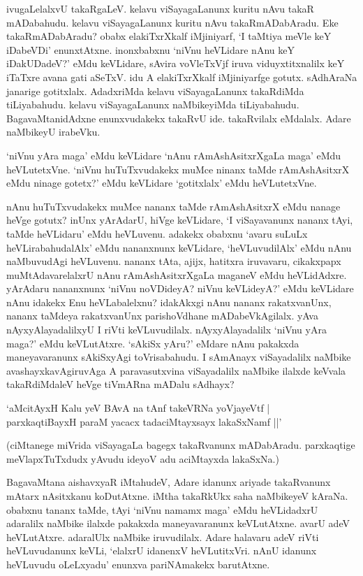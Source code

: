 ivugaLelalxvU takaRgaLeV. kelavu viSayagaLanunx kuritu nAvu takaR mADabahudu. kelavu viSayagaLanunx kuritu nAvu takaRmADabAradu. Eke takaRmADabAradu? obabx elakiTxrXkalf iMjiniyarf, `I taMtiya meVle keY iDabeVDi' enunxtAtxne. inonxbabxnu `niVnu heVLidare nAnu keY iDakUDadeV?' eMdu keVLidare, sAvira voVleTxVjf iruva viduyxtitxnalilx keY iTaTxre avana gati aSeTxV. idu A elakiTxrXkalf iMjiniyarfge gotutx. sAdhAraNa janarige gotitxlalx. AdadxriMda kelavu viSayagaLanunx takaRdiMda tiLiyabahudu. kelavu viSayagaLanunx naMbikeyiMda tiLiyabahudu. BagavaMtanidAdxne enunxvudakekx takaRvU ide. takaRvilalx eMdalalx. Adare naMbikeyU irabeVku.

`niVnu yAra maga' eMdu keVLidare `nAnu rAmAshAsitxrXgaLa maga' eMdu heVLutetxVne. `niVnu huTuTxvudakekx muMce ninanx taMde rAmAshAsitxrX eMdu ninage gotetx?' eMdu keVLidare `gotitxlalx' eMdu heVLutetxVne.

nAnu huTuTxvudakekx muMce nananx taMde rAmAshAsitxrX eMdu nanage heVge gotutx? inUnx yArAdarU, hiVge keVLidare, `I viSayavanunx nananx tAyi, taMde heVLidaru' eMdu heVLuvenu. adakekx obabxnu `avaru suLuLx heVLirabahudalAlx' eMdu nananxnunx keVLidare, `heVLuvudilAlx' eMdu nAnu naMbuvudAgi heVLuvenu. nananx tAta, ajijx, hatitxra iruvavaru, cikakxpapx muMtAdavarelalxrU nAnu rAmAshAsitxrXgaLa maganeV eMdu heVLidAdxre. yArAdaru nananxnunx `niVnu noVDideyA? niVnu keVLideyA?' eMdu keVLidare nAnu idakekx Enu heVLabalelxnu? idakAkxgi nAnu nananx rakatxvanUnx, nananx taMdeya rakatxvanUnx parishoVdhane mADabeVkAgilalx. yAva nAyxyAlayadalilxyU I riVti keVLuvudilalx. nAyxyAlayadalilx `niVnu yAra maga?' eMdu keVLutAtxre. `sAkiSx yAru?' eMdare nAnu pakakxda maneyavaranunx sAkiSxyAgi toVrisabahudu. I sAmAnayx viSayadalilx naMbike avashayxkavAgiruvAga A paravasutxvina viSayadalilx naMbike ilalxde keVvala takaRdiMdaleV heVge tiVmARna mADalu sAdhayx?

\begin{shloka}
`aMcitAyxH Kalu yeV BAvA na tAnf takeVRNa yoVjayeVtf |\\
parxkaqtiBayxH paraM yacacx tadaciMtayxsayx lakaSxNamf ||'
\end{shloka}

(ciMtanege miVrida viSayagaLa bagegx takaRvanunx mADabAradu. parxkaqtige meVlapxTuTxdudx yAvudu ideyoV adu aciMtayxda lakaSxNa.)

BagavaMtana aishavxyaR iMtahudeV, Adare idanunx ariyade takaRvanunx mAtarx nAsitxkanu koDutAtxne. iMtha takaRkUkx saha naMbikeyeV kAraNa. obabxnu tananx taMde, tAyi `niVnu namamx maga' eMdu heVLidadxrU adaralilx naMbike ilalxde pakakxda maneyavaranunx keVLutAtxne. avarU adeV heVLutAtxre. adaralUlx naMbike iruvudilalx. Adare halavaru adeV riVti heVLuvudanunx keVLi, `elalxrU idanenxV heVLutitxVri. nAnU idanunx heVLuvudu oLeLxyadu' enunxva pariNAmakekx barutAtxne.

